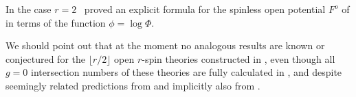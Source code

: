 \documentclass[11pt]{amsart}
\theoremstyle{definition}
\theoremstyle{remark}
\newcommand{\<}{\left<}
\renewcommand{\>}{\right>}
\numberwithin{equation}{section}
\begin{document}
In the case %
$r=2$~\cite{Bur16} proved %
an explicit formula for the spinless open potential $F^o$ of \cite{PST14,Tes15} in terms of the function $\phi=\log\Phi$. 


We should point out that at the moment no analogous results are known or conjectured for the $\lfloor r/2\rfloor$ open $r$-spin theories constructed in \cite{TZ1,TZ2}, even though all $g=0$ intersection numbers of these theories are fully calculated %
in \cite{TZ2}, and %
despite seemingly related predictions from \cite{Horiprivate} and implicitly also from \cite{Hori}.
\end{document}
